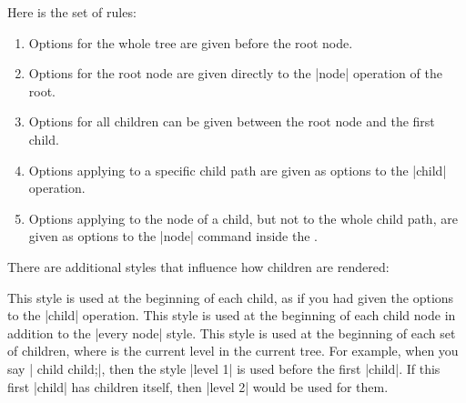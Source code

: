 Here is the set of rules:
\begin{enumerate}
\item
  Options for the whole tree are given before the root node.
\item
  Options for the root node are given directly to the |node| operation
  of the root.
\item
  Options for all children can be given between the root node and the
  first child.
\item
  Options applying to a specific child path are given as options to
  the |child| operation.
\item
  Options applying to the node of a child, but not to the whole child
  path, are given as options to the |node| command inside the
  .
\end{enumerate}

\begin{codeexample}
\end{codeexample}

There are additional styles that influence how children are rendered:
\begin{itemize}
  This style is used at the beginning of each child, as if you had
  given the options to the |child| operation.
  This style is used at the beginning of each child node in addition
  to the |every node| style.
  This style is used at the beginning of each set of children, where
   is the current level in the current tree. For example,
  when you say | child child;|, then the style |level 1| is
  used before the first |child|. If this first |child| has children
  itself, then |level 2| would be used for them.

\begin{codeexample}[]
\end{codeexample}
\end{itemize}




